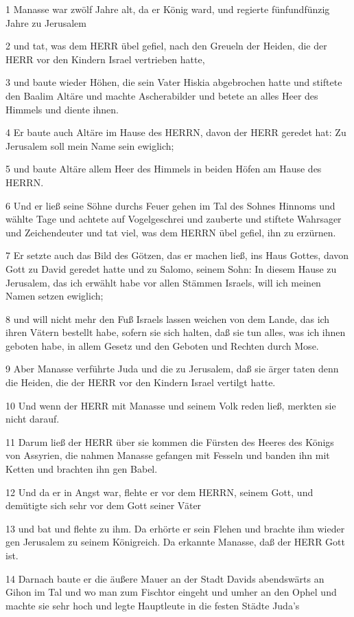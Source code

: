 \par 1 Manasse war zwölf Jahre alt, da er König ward, und regierte fünfundfünzig Jahre zu Jerusalem
\par 2 und tat, was dem HERR übel gefiel, nach den Greueln der Heiden, die der HERR vor den Kindern Israel vertrieben hatte,
\par 3 und baute wieder Höhen, die sein Vater Hiskia abgebrochen hatte und stiftete den Baalim Altäre und machte Ascherabilder und betete an alles Heer des Himmels und diente ihnen.
\par 4 Er baute auch Altäre im Hause des HERRN, davon der HERR geredet hat: Zu Jerusalem soll mein Name sein ewiglich;
\par 5 und baute Altäre allem Heer des Himmels in beiden Höfen am Hause des HERRN.
\par 6 Und er ließ seine Söhne durchs Feuer gehen im Tal des Sohnes Hinnoms und wählte Tage und achtete auf Vogelgeschrei und zauberte und stiftete Wahrsager und Zeichendeuter und tat viel, was dem HERRN übel gefiel, ihn zu erzürnen.
\par 7 Er setzte auch das Bild des Götzen, das er machen ließ, ins Haus Gottes, davon Gott zu David geredet hatte und zu Salomo, seinem Sohn: In diesem Hause zu Jerusalem, das ich erwählt habe vor allen Stämmen Israels, will ich meinen Namen setzen ewiglich;
\par 8 und will nicht mehr den Fuß Israels lassen weichen von dem Lande, das ich ihren Vätern bestellt habe, sofern sie sich halten, daß sie tun alles, was ich ihnen geboten habe, in allem Gesetz und den Geboten und Rechten durch Mose.
\par 9 Aber Manasse verführte Juda und die zu Jerusalem, daß sie ärger taten denn die Heiden, die der HERR vor den Kindern Israel vertilgt hatte.
\par 10 Und wenn der HERR mit Manasse und seinem Volk reden ließ, merkten sie nicht darauf.
\par 11 Darum ließ der HERR über sie kommen die Fürsten des Heeres des Königs von Assyrien, die nahmen Manasse gefangen mit Fesseln und banden ihn mit Ketten und brachten ihn gen Babel.
\par 12 Und da er in Angst war, flehte er vor dem HERRN, seinem Gott, und demütigte sich sehr vor dem Gott seiner Väter
\par 13 und bat und flehte zu ihm. Da erhörte er sein Flehen und brachte ihm wieder gen Jerusalem zu seinem Königreich. Da erkannte Manasse, daß der HERR Gott ist.
\par 14 Darnach baute er die äußere Mauer an der Stadt Davids abendswärts an Gihon im Tal und wo man zum Fischtor eingeht und umher an den Ophel und machte sie sehr hoch und legte Hauptleute in die festen Städte Juda's
